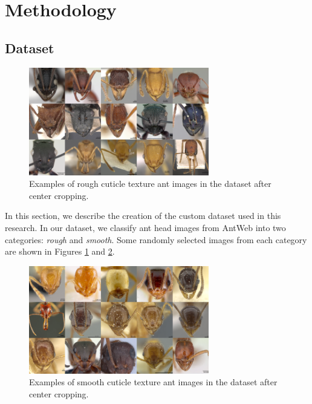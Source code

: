 \documentclass{aci}
\numberwithin{equation}{section}
\begin{document}
\section{Methodology}

\subsection{Dataset}

\begin{figure}[h]
    \centering
    \includegraphics[width=0.7\textwidth]{thesis_assets/images/rough_collage.png}
    \caption{Examples of rough cuticle texture ant images in the dataset after
        center cropping.}
    \label{fig:rough-cuticle-texture}
\end{figure}

In this section, we describe the creation of the custom dataset used in this
research. In our dataset, we classify ant head images from AntWeb
\cite{perrichot_antweb_2012} into two categories: \textit{rough} and
\textit{smooth}. Some randomly selected images from each category are shown in
Figures \ref{fig:rough-cuticle-texture} and \ref{fig:smooth-cuticle-texture}.

\begin{figure}
    \centering
    \includegraphics[width=0.7\textwidth]{thesis_assets/images/smooth_collage.png}
    \caption{Examples of smooth cuticle texture ant images in the dataset after
        center cropping.}
    \label{fig:smooth-cuticle-texture}
\end{figure}
\end{document}
